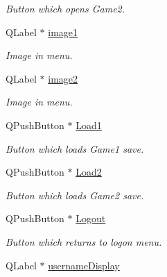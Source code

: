 \begin{DoxyCompactItemize}
\begin{DoxyCompactList}\small\item\em Button which opens Game2. \end{DoxyCompactList}\item 
\hypertarget{classmenuWidget_af34e7229bf58a5b446cfdf8d4c2ee4b2}{Q\-Label $\ast$ \hyperlink{classmenuWidget_af34e7229bf58a5b446cfdf8d4c2ee4b2}{image1}}\label{classmenuWidget_af34e7229bf58a5b446cfdf8d4c2ee4b2}

\begin{DoxyCompactList}\small\item\em Image in menu. \end{DoxyCompactList}\item 
\hypertarget{classmenuWidget_a81ff276d3f6ebd747ced3270fff55736}{Q\-Label $\ast$ \hyperlink{classmenuWidget_a81ff276d3f6ebd747ced3270fff55736}{image2}}\label{classmenuWidget_a81ff276d3f6ebd747ced3270fff55736}

\begin{DoxyCompactList}\small\item\em Image in menu. \end{DoxyCompactList}\item 
\hypertarget{classmenuWidget_a0031500189b563eded6ce4dc2615cace}{Q\-Push\-Button $\ast$ \hyperlink{classmenuWidget_a0031500189b563eded6ce4dc2615cace}{Load1}}\label{classmenuWidget_a0031500189b563eded6ce4dc2615cace}

\begin{DoxyCompactList}\small\item\em Button which loads Game1 save. \end{DoxyCompactList}\item 
\hypertarget{classmenuWidget_ae9288ff22cafb7a5dd0a4086d435eed1}{Q\-Push\-Button $\ast$ \hyperlink{classmenuWidget_ae9288ff22cafb7a5dd0a4086d435eed1}{Load2}}\label{classmenuWidget_ae9288ff22cafb7a5dd0a4086d435eed1}

\begin{DoxyCompactList}\small\item\em Button which loads Game2 save. \end{DoxyCompactList}\item 
\hypertarget{classmenuWidget_a84cead9f54f5471a6345823b2587c666}{Q\-Push\-Button $\ast$ \hyperlink{classmenuWidget_a84cead9f54f5471a6345823b2587c666}{Logout}}\label{classmenuWidget_a84cead9f54f5471a6345823b2587c666}

\begin{DoxyCompactList}\small\item\em Button which returns to logon menu. \end{DoxyCompactList}\item 
\hypertarget{classmenuWidget_aa793cbffd94b9a0a7670f9413df2c9d9}{Q\-Label $\ast$ \hyperlink{classmenuWidget_aa793cbffd94b9a0a7670f9413df2c9d9}{username\-Display}}\label{classmenuWidget_aa793cbffd94b9a0a7670f9413df2c9d9}


\end{DoxyCompactItemize}
